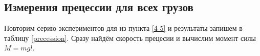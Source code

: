 \documentclass[a4paper,12pt]{article}
\begin{document}
\subsection{Измерения прецессии для всех грузов}

Повторим серию экспериментов для из пункта \ref{4-5} и результаты запишем в таблицу \ref{precession}. Сразу найдём скорость прецесии и вычислим момент силы $M = mgl$.

\end{document}
